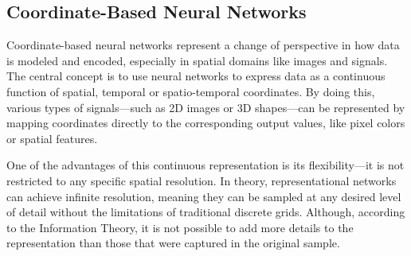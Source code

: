 \subsection{Coordinate-Based Neural Networks}

Coordinate-based neural networks represent a change of perspective in how data is modeled and encoded, especially in spatial domains like images and signals. The central concept is to use neural networks to express data as a continuous function of spatial, temporal or spatio-temporal coordinates. By doing this, various types of signals—such as 2D images or 3D shapes—can be represented by mapping coordinates directly to the corresponding output values, like pixel colors or spatial features.





One of the advantages of this continuous representation is its flexibility—it is not restricted to any specific spatial resolution. In theory, representational networks can achieve infinite resolution, meaning they can be sampled at any desired level of detail without the limitations of traditional discrete grids. Although, according to the Information Theory, it is not possible to add more details to the representation than those that were captured in the original sample.



